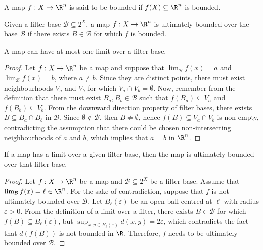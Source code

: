 \begin{definition}[Bounded]\label{def: bounded-several}
A map \(f: X \to \R^n\) is said to be bounded if \(f(X) \subseteq \R^n\) is
bounded.
\end{definition}

\begin{definition}\label{def: ulti-bounded-several}
Given a filter base \(\mathcal B \subseteq 2^X\), a map \(f: X \to \R^n\) is
ultimately bounded over the base \(\mathcal B\) if there exists \(B \in
\mathcal B\) for which \(f\) is bounded.
\end{definition}

\begin{proposition}
A map can have at most one limit over a filter base.
\end{proposition}

\begin{proof}
Let \(f: X \to \R^n\) be a map and suppose that \(\lim_\mathcal{B} f(x) = a\)
and \(\lim_\mathcal{B} f(x) = b\), where \(a \neq b\). Since they are distinct
points, there must exist neighbourhoods \(V_a\) and \(V_b\) for which \(V_a
\cap V_b = \emptyset\). Now, remember from the definition that there must
exist \(B_a, B_b \in \mathcal B\) such that \(f(B_a) \subseteq V_a\) and
\(f(B_b) \subseteq V_b\). From the downward direction property of filter
bases, there exists \(B \subseteq B_a \cap B_b\) in \(\mathcal B\). Since
\(\emptyset \not\in \mathcal B\), then \(B \neq \emptyset\), hence \(f(B)
\subseteq V_a \cap V_b\) is non-empty, contradicting the assumption that there
could be chosen non-intersecting neighbourhoods of \(a\) and \(b\), which
implies that \(a = b\) in \(\R^n\).
\end{proof}

\begin{proposition}
If a map has a limit over a given filter base, then the map is ultimately
bounded over that filter base.
\end{proposition}

\begin{proof}
Let \(f: X \to \R^n\) be a map and \(\mathcal B \subseteq 2^X\) be a filter
base. Assume that \(\lim_\mathcal{B} f(x) = \ell \in \R^n\). For the sake of
contradiction, suppose that \(f\) is not ultimately bounded over \(\mathcal
B\). Let \(B_\ell(\varepsilon)\) be an open ball centred at \(\ell\) with
radius \(\varepsilon > 0\). From the definition of a limit over a filter,
there exists \(B \in \mathcal B\) for which \(f(B) \subseteq
B_\ell(\varepsilon)\), but \(\sup_{x, y \in B_\ell(\varepsilon)} d(x, y) = 2
\varepsilon\), which contradicts the fact that \(d(f(B))\) is not bounded in
\(\R\). Therefore, \(f\) needs to be ultimately bounded over \(\mathcal B\).
\end{proof}

